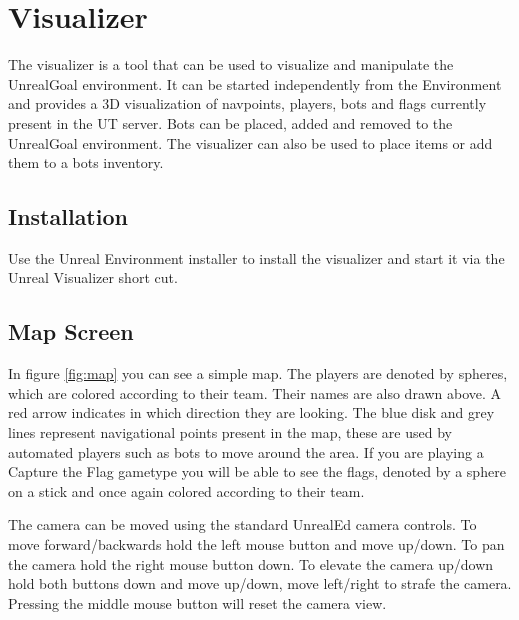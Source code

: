 \documentclass[11pt,a4paper]{article}
\begin{document}
%
%
%
\section{Visualizer}\label{sec:vis}
%


The visualizer is a tool that can be used to visualize and manipulate the UnrealGoal environment. It can be started independently from the Environment and provides a 3D visualization of navpoints,  players, bots and flags currently present in the UT server. Bots can be placed, added and removed to the UnrealGoal environment. The visualizer can also be used to place items or add them to a bots inventory.

\subsection{Installation}

Use the Unreal Environment installer to install the visualizer and start it via the Unreal Visualizer short cut.

\subsection{Map Screen}

In figure \ref{fig:map} you can see a simple map. The players are denoted by spheres, which are colored according to their team. Their names are also drawn above. A red arrow indicates in which direction they are looking. The blue disk and grey lines represent navigational points present in the map, these are used by automated players such as bots to move around the area. If you are playing a Capture the Flag gametype you will be able to see the flags, denoted by a sphere on a stick and once again colored according to their team. 

The camera can be moved using the standard UnrealEd camera controls. To move forward/backwards hold the left mouse button and move up/down. To pan the camera hold the right mouse button down. To elevate the camera up/down  hold both buttons down and move up/down, move left/right to strafe the camera. Pressing the middle mouse button will reset the camera view.

\end{document}

